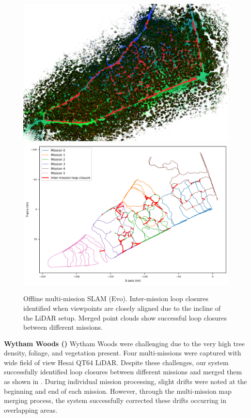 \begin{figure}[htbp]
  \centering
  \includegraphics[width=\columnwidth]{pics/exp_3_offline_evo_pcd.png}
  \includegraphics[width=\columnwidth]{pics/exp_3_1_multimission_slam_evo_ratio.png}
  \caption{Offline multi-mission SLAM (Evo). Inter-mission loop closures identified when viewpoints are closely aligned due to the incline of the LiDAR setup. Merged point clouds show successful loop closures between different missions.}
  \label{fig:exp_multi_mission_evo}
\end{figure}
\newline
\textbf{Wytham Woods ()} \hspace{0.5em}  Wytham Woods were challenging due to the very high tree density, foliage, and vegetation present. Four multi-missions were captured with wide field of view Hesai QT64 LiDAR. Despite these challenges, our system successfully identified loop closures between different missions and merged them as shown in . During individual mission processing, slight drifts were noted at the beginning and end of each mission. However, through the multi-mission map merging process, the system successfully corrected these drifts occurring in overlapping areas. \\

